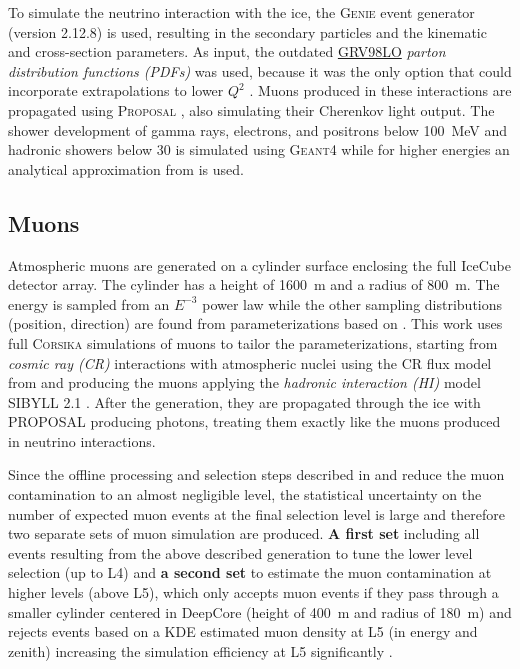 To simulate the neutrino interaction with the ice, the \textsc{Genie} event generator  (version 2.12.8) is used, resulting in the secondary particles and the kinematic and cross-section parameters. As input, the outdated \href{https://internal.dunescience.org/doxygen/classgenie_1_1GRV89LO.html}{GRV98LO}  \textit{parton distribution functions (PDFs)} was used, because it was the only option that could incorporate extrapolations to lower $Q^2$ . Muons produced in these interactions are propagated using \textsc{Proposal} , also simulating their Cherenkov light output. The shower development of gamma rays, electrons, and positrons below \SI{100}{\mega\electronvolt} and hadronic showers below \SI{30}{\gev} is simulated using \textsc{Geant4}  while for higher energies an analytical approximation from  is used.


\subsection{Muons}

Atmospheric muons are generated on a cylinder surface enclosing the full IceCube detector array. The cylinder has a height of \SI{1600}{\meter} and a radius of \SI{800}{\meter}. The energy is sampled from an $E^{-3}$ power law while the other sampling distributions (position, direction) are found from parameterizations based on . This work uses full \textsc{Corsika}  simulations of muons to tailor the parameterizations, starting from \textit{cosmic ray (CR)} interactions with atmospheric nuclei using the CR flux model from  and producing the muons applying the \textit{hadronic interaction (HI)} model SIBYLL 2.1 . After the generation, they are propagated through the ice with PROPOSAL producing photons, treating them exactly like the muons produced in neutrino interactions.

Since the offline processing and selection steps described in  and  reduce the muon contamination to an almost negligible level, the statistical uncertainty on the number of expected muon events at the final selection level is large and therefore two separate sets of muon simulation are produced. \textbf{A first set} including all events resulting from the above described generation to tune the lower level selection (up to L4) and \textbf{a second set} to estimate the muon contamination at higher levels (above L5), which only accepts muon events if they pass through a smaller cylinder centered in DeepCore (height of \SI{400}{\meter} and radius of \SI{180}{\meter}) and rejects events based on a KDE estimated muon density at L5 (in energy and zenith) increasing the simulation efficiency at L5 significantly .


